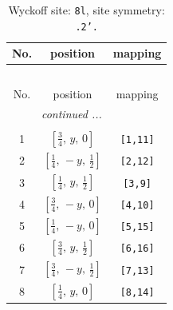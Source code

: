 \documentclass[fleqn,8pt]{jsarticle}
\begin{document}
\begin{longtable}{ccc}
\caption{Wyckoff site: {\tt 8l}, site symmetry: {\tt .2'.}}
 \\
 \hline \hline
No. & position & mapping \\ \hline \endfirsthead

\multicolumn{2}{l}{\tablename\ \thetable{}} \\
 \hline \hline
No. & position & mapping \\ \hline \endhead

 \hline \hline
\multicolumn{2}{r}{\footnotesize\it continued ...} \\ \endfoot

 \hline \hline
\multicolumn{2}{r}{} \\ \endlastfoot

1 & $\left[ \frac{3}{4},\, y,\, 0 \right]$ & {\tt [1,11]} \\ \hline
2 & $\left[ \frac{1}{4},\, - y,\, \frac{1}{2} \right]$ & {\tt [2,12]} \\ \hline
3 & $\left[ \frac{1}{4},\, y,\, \frac{1}{2} \right]$ & {\tt [3,9]} \\ \hline
4 & $\left[ \frac{3}{4},\, - y,\, 0 \right]$ & {\tt [4,10]} \\ \hline
5 & $\left[ \frac{1}{4},\, - y,\, 0 \right]$ & {\tt [5,15]} \\ \hline
6 & $\left[ \frac{3}{4},\, y,\, \frac{1}{2} \right]$ & {\tt [6,16]} \\ \hline
7 & $\left[ \frac{3}{4},\, - y,\, \frac{1}{2} \right]$ & {\tt [7,13]} \\ \hline
8 & $\left[ \frac{1}{4},\, y,\, 0 \right]$ & {\tt [8,14]} \\
\end{longtable}
\renewcommand{\arraystretch}{1.2}
\end{document}
